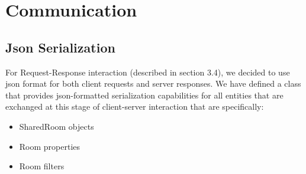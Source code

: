 \section{Communication}\label{sec:communication_design}


\subsection{Json Serialization}
For Request-Response interaction (described in section 3.4), we decided to use json format for both client requests and server responses. We have defined a class that provides json-formatted serialization capabilities for all entities that are exchanged at this stage of client-server interaction that are specifically:
\begin{itemize}
	\item SharedRoom objects
	\item Room properties
	\item Room filters
\end{itemize}

